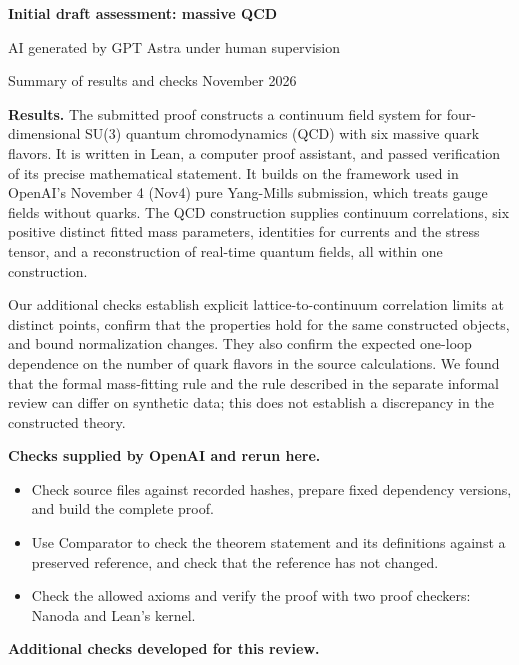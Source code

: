 \documentclass[
  11pt,
]{article}
\author{}
\date{}
\providecommand{\tightlist}{%
  \setlength{\itemsep}{0pt}\setlength{\parskip}{0pt}}
\begin{document}
\begin{center}
{\large\bfseries Initial draft assessment: massive QCD}\par
{\small AI generated by GPT Astra under human supervision}\par
{\small Summary of results and checks\quad\textbullet{} November 2026}
\end{center}

\textbf{Results.} The submitted proof constructs a continuum field
system for four-dimensional SU(3) quantum chromodynamics (QCD) with six
massive quark flavors. It is written in Lean, a computer proof
assistant, and passed verification of its precise mathematical
statement. It builds on the framework used in OpenAI's November 4 (Nov4)
pure Yang-Mills submission, which treats gauge fields without quarks.
The QCD construction supplies continuum correlations, six positive
distinct fitted mass parameters, identities for currents and the stress
tensor, and a reconstruction of real-time quantum fields, all within one
construction.

Our additional checks establish explicit lattice-to-continuum
correlation limits at distinct points, confirm that the properties hold
for the same constructed objects, and bound normalization changes. They
also confirm the expected one-loop dependence on the number of quark
flavors in the source calculations. We found that the formal
mass-fitting rule and the rule described in the separate informal review
can differ on synthetic data; this does not establish a discrepancy in
the constructed theory.

\textbf{Checks supplied by OpenAI and rerun here.}

\begin{itemize}
\tightlist
\item
  Check source files against recorded hashes, prepare fixed dependency
  versions, and build the complete proof.
\item
  Use Comparator to check the theorem statement and its definitions
  against a preserved reference, and check that the reference has not
  changed.
\item
  Check the allowed axioms and verify the proof with two proof checkers:
  Nanoda and Lean's kernel.
\end{itemize}

\textbf{Additional checks developed for this review.}
\end{document}
